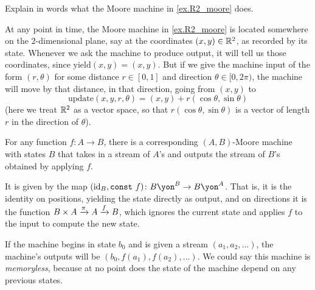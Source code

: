 \documentclass[Book-Poly]{subfiles}
\begin{document}
\begin{exercise}
Explain in words what the Moore machine in \cref{ex.R2_moore} does.
\begin{solution}
At any point in time, the Moore machine in \cref{ex.R2_moore} is located somewhere on the $2$-dimensional plane, say at the coordinates $(x, y) \in \mathbb{R}^2$, as recorded by its state.
Whenever we ask the machine to produce output, it will tell us those coordinates, since $\text{yield}(x, y) = (x, y)$.
But if we give the machine input of the form $(r, \theta)$ for some distance $r \in [0,1]$ and direction $\theta \in [0, 2\pi)$, the machine will move by that distance, in that direction, going from $(x, y)$ to
\[
    \text{update}(x,y,r,\theta) = (x,y) + r(\cos\theta, \sin\theta)
\]
(here we treat $\mathbb{R}^2$ as a vector space, so that $r(\cos\theta, \sin\theta)$ is a vector of length $r$ in the direction of $\theta$).
\end{solution}
\end{exercise}

\begin{example}\label{ex.funs_to_moore}
For any function $f\colon A\to B$, there is a corresponding $(A,B)$-Moore machine with states $B$ that takes in a stream of $A$'s and outputs the stream of $B$'s obtained by applying $f$. 

It is given by the map $(\id_B,\texttt{const} \ f)\colon B\yon^B\to B\yon^A$. That is, it is the identity on positions, yielding the state directly as output, and on directions it is the function $B\times A\xrightarrow{\pi}A\xrightarrow{f} B$, which ignores the current state and applies $f$ to the input to compute the new state.

If the machine begins in state $b_0$ and is given a stream $(a_1,a_2,\ldots)$, the machine's outputs will be $(b_0,f(a_1),f(a_2),\ldots)$. We could say this machine is \emph{memoryless}, because at no point does the state of the machine depend on any previous states.
\end{example}
\end{document}
